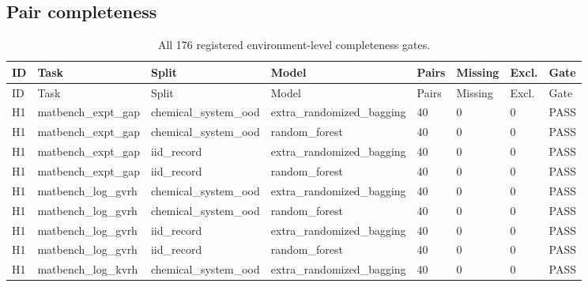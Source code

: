 \documentclass[10pt]{article}
\begin{document}
\begin{landscape}

\section{Pair completeness}

\begingroup\scriptsize
\begin{longtable}{L{.32in}L{1.05in}L{1.2in}L{1.3in}L{.42in}L{.42in}L{.42in}L{.48in}}
\caption{All 176 registered environment-level completeness gates.}\\
\toprule
ID & Task & Split & Model & Pairs & Missing & Excl. & Gate\\
\midrule
\endfirsthead
\toprule
ID & Task & Split & Model & Pairs & Missing & Excl. & Gate\\
\midrule
\endhead
H1 & matbench\_\allowbreak{}expt\_\allowbreak{}gap & chemical\_\allowbreak{}system\_\allowbreak{}ood & extra\_\allowbreak{}randomized\_\allowbreak{}bagging & 40 & 0 & 0 & PASS\\
H1 & matbench\_\allowbreak{}expt\_\allowbreak{}gap & chemical\_\allowbreak{}system\_\allowbreak{}ood & random\_\allowbreak{}forest & 40 & 0 & 0 & PASS\\
H1 & matbench\_\allowbreak{}expt\_\allowbreak{}gap & iid\_\allowbreak{}record & extra\_\allowbreak{}randomized\_\allowbreak{}bagging & 40 & 0 & 0 & PASS\\
H1 & matbench\_\allowbreak{}expt\_\allowbreak{}gap & iid\_\allowbreak{}record & random\_\allowbreak{}forest & 40 & 0 & 0 & PASS\\
H1 & matbench\_\allowbreak{}log\_\allowbreak{}gvrh & chemical\_\allowbreak{}system\_\allowbreak{}ood & extra\_\allowbreak{}randomized\_\allowbreak{}bagging & 40 & 0 & 0 & PASS\\
H1 & matbench\_\allowbreak{}log\_\allowbreak{}gvrh & chemical\_\allowbreak{}system\_\allowbreak{}ood & random\_\allowbreak{}forest & 40 & 0 & 0 & PASS\\
H1 & matbench\_\allowbreak{}log\_\allowbreak{}gvrh & iid\_\allowbreak{}record & extra\_\allowbreak{}randomized\_\allowbreak{}bagging & 40 & 0 & 0 & PASS\\
H1 & matbench\_\allowbreak{}log\_\allowbreak{}gvrh & iid\_\allowbreak{}record & random\_\allowbreak{}forest & 40 & 0 & 0 & PASS\\
H1 & matbench\_\allowbreak{}log\_\allowbreak{}kvrh & chemical\_\allowbreak{}system\_\allowbreak{}ood & extra\_\allowbreak{}randomized\_\allowbreak{}bagging & 40 & 0 & 0 & PASS\\

\end{longtable}
\end{landscape}
\end{document}
